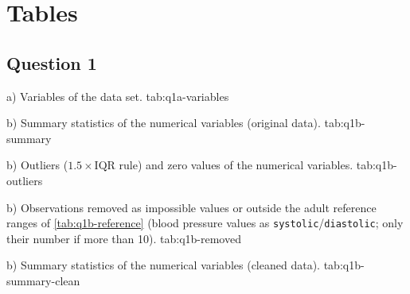 \section{Tables}\label{app:tables}

\subsection{Question 1}

  {a) Variables of the data set.}
  {tab:q1a-variables}

  {b) Summary statistics of the numerical variables (original data).}
  {tab:q1b-summary}

  {b) Outliers ($1.5 \times \mathrm{IQR}$ rule) and zero values of the numerical variables.}
  {tab:q1b-outliers}


  {b) Observations removed as impossible values or outside the adult reference ranges of \autoref{tab:q1b-reference} (blood pressure values as \texttt{systolic}/\texttt{diastolic}; only their number if more than 10).}
  {tab:q1b-removed}

  {b) Summary statistics of the numerical variables (cleaned data).}
  {tab:q1b-summary-clean}

